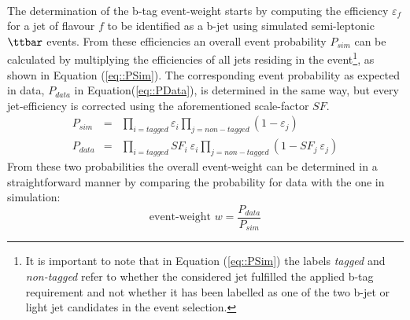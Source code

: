 \\
The determination of the b-tag event-weight starts by computing the efficiency $\varepsilon_{f}$ for a jet of flavour $f$ to be identified as a b-jet using simulated semi-leptonic $\ttbar$ events.
From these efficiencies an overall event probability $P_{sim}$ can be calculated by multiplying the efficiencies of all jets residing in the event\footnote{It is important to note that in Equation (\ref{eq::PSim}) the labels \textit{tagged} and \textit{non-tagged} refer to whether the considered jet fulfilled the applied b-tag requirement and not whether it has been labelled as one of the two b-jet or light jet candidates in the event selection.}, as shown in Equation (\ref{eq::PSim}).
The corresponding event probability as expected in data, $P_{data}$ in Equation(\ref{eq::PData}), is determined in the same way, but every jet-efficiency is corrected using the aforementioned scale-factor $SF$.
\begin{eqnarray} 
 P_{sim} & = & \prod_{i = tagged} \varepsilon_{i} \prod_{j = non-tagged} (1-\varepsilon_{j})  \label{eq::PSim} \\
 P_{data} & = & \prod_{i = tagged} SF_{i} ~ \varepsilon_{i} \prod_{j = non-tagged} (1- SF_{j} ~ \varepsilon_{j}) \label{eq::PData}
\end{eqnarray}
From these two probabilities the overall event-weight can be determined in a straightforward manner by comparing the probability for data with the one in simulation:
\begin{equation}
 \textrm{event-weight } w = \dfrac{P_{data}}{P_{sim}}
\end{equation}

